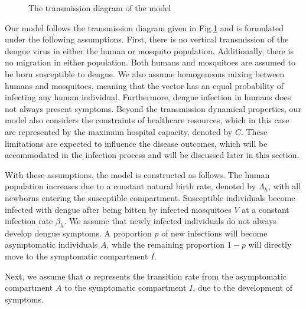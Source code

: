 \documentclass[preprint]{elsarticle}
\begin{document}
\begin{figure}
\caption{The transmission diagram of the model}\label{fig1}
\end{figure}


Our model follows the transmission diagram given in Fig.\ref{fig1} and is formulated under the following assumptions. First, there is no vertical transmission of the dengue virus in either the human or mosquito population. Additionally, there is no migration in either population. Both humans and mosquitoes are assumed to be born susceptible to dengue. We also assume homogeneous mixing between humans and mosquitoes, meaning that the vector has an equal probability of infecting any human individual. Furthermore, dengue infection in humans does not always present symptoms. Beyond the transmission dynamical properties, our model also considers the constraints of healthcare resources, which in this case are represented by the maximum hospital capacity, denoted by $C$. These limitations are expected to influence the disease outcomes, which will be accommodated in the infection process and will be discussed later in this section.


With these assumptions, the model is constructed as follows. The human population increases due to a constant natural birth rate, denoted by $\Lambda_h$, with all newborns entering the susceptible compartment. Susceptible individuals become infected with dengue after being bitten by infected mosquitoes $V$ at a constant infection rate $\beta_h$. We assume that newly infected individuals do not always develop dengue symptoms. A proportion $p$ of new infections will become asymptomatic individuals $A$, while the remaining proportion $1-p$ will directly move to the symptomatic compartment $I$.

Next, we assume that $\alpha$ represents the transition rate from the asymptomatic compartment $A$ to the symptomatic compartment $I$, due to the development of symptoms.
\end{document}
